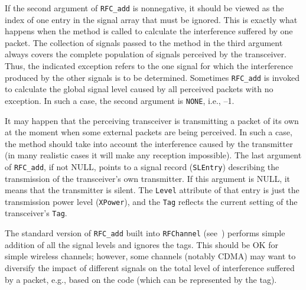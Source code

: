 If the second argument of {\tt RFC\_add} is nonnegative, it should be viewed
as the index of one entry in the signal array that must be ignored.
This is exactly what happens when the method is called to calculate the
interference suffered by one packet.
The collection of signals passed to the method in the third argument always
covers the complete population of signals perceived by the transceiver.
Thus, the indicated exception refers to the one signal for which the
interference produced by the other signals is to be determined.
Sometimes {\tt RFC\_add} is invoked to calculate the global signal level
caused by all perceived packets with no exception.
In such a case, the second argument is {\tt NONE}, i.e., --1.

It may happen that the perceiving transceiver is transmitting a
packet of its own at the moment when some external packets are being perceived.
In such a case, the method should take into account the interference
caused by the transmitter (in many realistic cases it will make any reception
impossible).
The last argument of {\tt RFC\_add}, if not NULL, points to a signal record
({\tt SLEntry}) describing the transmission of the transceiver's own
transmitter.
If this argument is NULL, it means that the transmitter is silent.
The {\tt Level} attribute of that entry is just the transmission power
level ({\tt XPower}), and the {\tt Tag} reflects the current setting of the
transceiver's {\tt Tag}.

The standard version of {\tt RFC\_add} built into {\tt RFChannel}
(see~) performs simple addition of all the signal levels
and ignores the tags.
This should be OK for simple wireless channels; however, some channels
(notably CDMA) may want to diversify the impact of different signals on
the total level of interference suffered by a packet, e.g., based on the
code (which can be represented by the tag).

